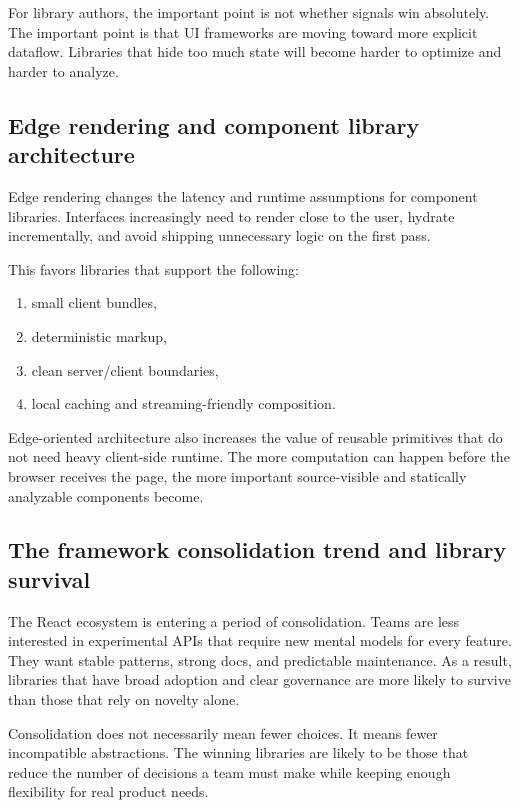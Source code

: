 For library authors, the important point is not whether signals win absolutely. The important point is that UI frameworks are moving toward more explicit dataflow. Libraries that hide too much state will become harder to optimize and harder to analyze.

\subsection{Edge rendering and component library architecture}
Edge rendering changes the latency and runtime assumptions for component libraries. Interfaces increasingly need to render close to the user, hydrate incrementally, and avoid shipping unnecessary logic on the first pass.

This favors libraries that support the following:

\begin{enumerate}[leftmargin=*, itemsep=0.35em]
  \item small client bundles,
  \item deterministic markup,
  \item clean server/client boundaries,
  \item local caching and streaming-friendly composition.
\end{enumerate}

Edge-oriented architecture also increases the value of reusable primitives that do not need heavy client-side runtime. The more computation can happen before the browser receives the page, the more important source-visible and statically analyzable components become.

\subsection{The framework consolidation trend and library survival}
The React ecosystem is entering a period of consolidation. Teams are less interested in experimental APIs that require new mental models for every feature. They want stable patterns, strong docs, and predictable maintenance. As a result, libraries that have broad adoption and clear governance are more likely to survive than those that rely on novelty alone.

Consolidation does not necessarily mean fewer choices. It means fewer incompatible abstractions. The winning libraries are likely to be those that reduce the number of decisions a team must make while keeping enough flexibility for real product needs.

